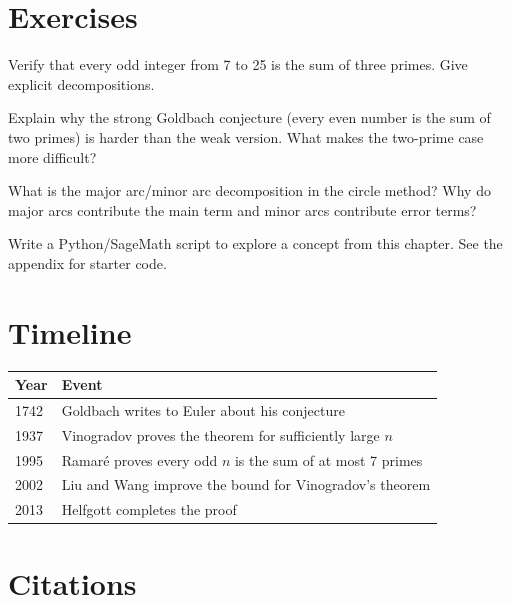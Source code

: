 \section{Exercises}

\begin{exercise}[Basic]
Verify that every odd integer from 7 to 25 is the sum of three primes. Give explicit decompositions.
\end{exercise}

\begin{exercise}[Intermediate]
Explain why the strong Goldbach conjecture (every even number is the sum of two primes) is harder than the weak version. What makes the two-prime case more difficult?
\end{exercise}

\begin{exercise}[Challenge]
What is the major arc/minor arc decomposition in the circle method? Why do major arcs contribute the main term and minor arcs contribute error terms?
\end{exercise}


\begin{exercise}[Computational]
Write a Python/SageMath script to explore a concept from this chapter. See the appendix for starter code.
\end{exercise}

\section{Timeline}

\begin{tabularx}{\linewidth}{lX}
\toprule
\textbf{Year} & \textbf{Event} \\ \midrule
1742 & Goldbach writes to Euler about his conjecture \\ 
1937 & Vinogradov proves the theorem for sufficiently large $n$ \cite{vinogradov1937} \\ 
1995 & Ramaré proves every odd $n$ is the sum of at most 7 primes \cite{ramare1995} \\ 
2002 & Liu and Wang improve the bound for Vinogradov's theorem \cite{liu2002} \\ 
2013 & Helfgott completes the proof \cite{helfgott2013} \\ \bottomrule
\end{tabularx}

\section{Citations}

